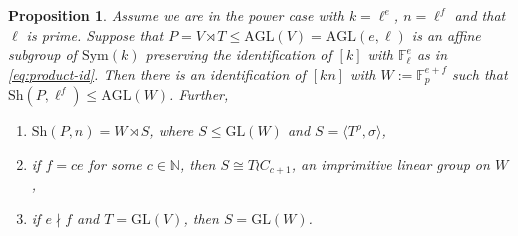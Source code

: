 \documentclass[12pt]{amsart}
\newtheorem{prop}[thm]{Proposition}
\theoremstyle{remark}
\theoremstyle{definition}
\newcommand{\sym}{\mathrm{Sym}}
\newcommand{\sh}{\mathrm{Sh}}
\newcommand{\GL}{\mathrm{GL}}
\newcommand{\AGL}{\mathrm{AGL}}
\begin{document}
\begin{prop} \label{prop:affine}
Assume we are in the power case with $k=\ell^e$, $n=\ell^f$ and that $\ell$ is prime. Suppose that $P =  V \rtimes T \leqslant \AGL(V) = \AGL(e,\ell)$ is an affine subgroup of $\sym(k)$ preserving the identification of $[k]$ with $\mathbb F_\ell^e$ as  in \eqref{eq:product-id}. Then there is an identification of $[kn]$ with $W:=\mathbb F_p^{e+f}$ such that $\sh(P,\ell^f) \leqslant \AGL(W)$. Further,
\begin{enumerate}
\item $\sh(P,n) = W \rtimes S$, where $S \leqslant \GL(W)$ and $S=\langle T^\rho,\sigma\rangle$,
\item if $f=ce$ for some $c\in \mathbb N$, then $S  \cong T \wr C_{c+1}$, an imprimitive linear group on $W$,
\item if $e \nmid f$ and $T= \GL(V)$, then $S  = \GL(W)$.
\end{enumerate}
\end{prop}
\end{document}
